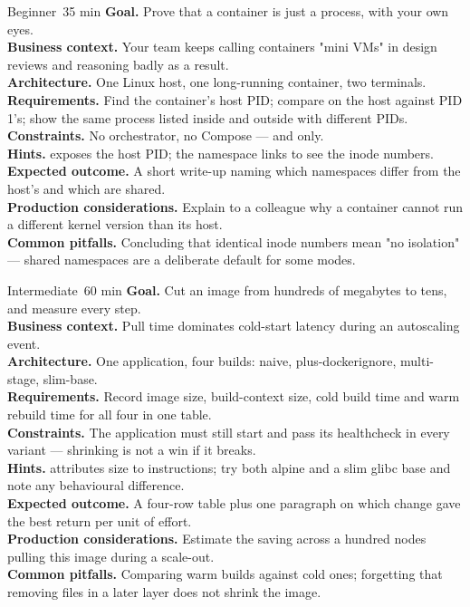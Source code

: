\begin{minilab}{Beginner}{~35 min}
\textbf{Goal.} Prove that a container is just a process, with your own eyes.\\
\textbf{Business context.} Your team keeps calling containers "mini VMs" in design reviews and reasoning badly as a result.\\
\textbf{Architecture.} One Linux host, one long-running container, two terminals.\\
\textbf{Requirements.} Find the container's host PID; compare  on the host against PID 1's; show the same process listed inside and outside with different PIDs.\\
\textbf{Constraints.} No orchestrator, no Compose ---  and  only.\\
\textbf{Hints.}  exposes the host PID;  the namespace links to see the inode numbers.\\
\textbf{Expected outcome.} A short write-up naming which namespaces differ from the host's and which are shared.\\
\textbf{Production considerations.} Explain to a colleague why a container cannot run a different kernel version than its host.\\
\textbf{Common pitfalls.} Concluding that identical inode numbers mean "no isolation" --- shared namespaces are a deliberate default for some modes.
\end{minilab}

\begin{minilab}{Intermediate}{~60 min}
\textbf{Goal.} Cut an image from hundreds of megabytes to tens, and measure every step.\\
\textbf{Business context.} Pull time dominates cold-start latency during an autoscaling event.\\
\textbf{Architecture.} One application, four builds: naive, plus-dockerignore, multi-stage, slim-base.\\
\textbf{Requirements.} Record image size, build-context size, cold build time and warm rebuild time for all four in one table.\\
\textbf{Constraints.} The application must still start and pass its healthcheck in every variant --- shrinking is not a win if it breaks.\\
\textbf{Hints.}  attributes size to instructions; try both alpine and a slim glibc base and note any behavioural difference.\\
\textbf{Expected outcome.} A four-row table plus one paragraph on which change gave the best return per unit of effort.\\
\textbf{Production considerations.} Estimate the saving across a hundred nodes pulling this image during a scale-out.\\
\textbf{Common pitfalls.} Comparing warm builds against cold ones; forgetting that removing files in a later layer does not shrink the image.
\end{minilab}

